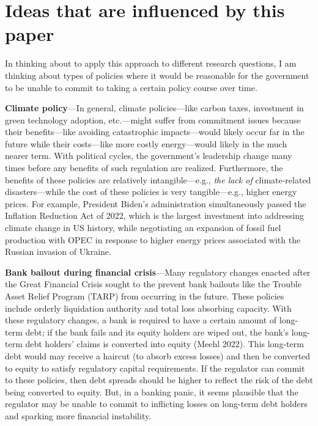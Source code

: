 \documentclass{article}
\begin{document}
\section{Ideas that are influenced by this paper}

In thinking about to apply this approach to different research questions, I am thinking about types of policies where it would be reasonable for the government to be unable to commit to taking a certain policy course over time.

\textbf{Climate policy}---In general, climate policies---like carbon taxes, investment in green technology adoption, etc.---might suffer from commitment issues because their benefits---like avoiding catastrophic impacts---would likely occur far in the future while their costs---like more costly energy---would likely in the much nearer term. With political cycles, the government's leadership change many times before any benefits of such regulation are realized.  Furthermore, the benefits of these policies are relatively intangible---e.g., \textit{the lack of} climate-related disasters---while the cost of these policies is very tangible---e.g., higher energy prices.  For example, President Biden's administration simultaneously passed the Inflation Reduction Act of 2022, which is the largest investment into addressing climate change in US history, while negotiating an expansion of fossil fuel production with OPEC in response to higher energy prices associated with the Russian invasion of Ukraine.

\textbf{Bank bailout during financial crisis}---Many regulatory changes enacted after the Great Financial Crisis sought to the prevent bank bailouts like the Trouble Asset Relief Program (TARP) from occurring in the future. These policies include orderly liquidation authority and total loss absorbing capacity.  With these regulatory changes, a bank is required to have a certain amount of long-term debt; if the bank fails and its equity holders are wiped out, the bank's long-term debt holders' claims is converted into equity (Meehl 2022).  This long-term debt would may receive a haircut (to absorb excess losses) and then be converted to equity to satisfy regulatory capital requirements. If the regulator can commit to these policies, then debt spreads should be higher to reflect the risk of the debt being converted to equity. But, in a banking panic, it seems plausible that the regulator may be unable to commit to inflicting losses on long-term debt holders and sparking more financial instability.
\end{document}
